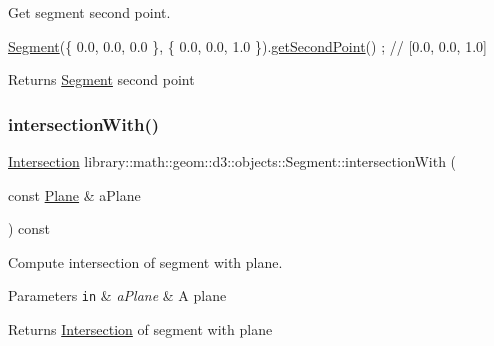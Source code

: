 Get segment second point. 


\begin{DoxyCode}
\hyperlink{classlibrary_1_1math_1_1geom_1_1d3_1_1objects_1_1_segment_a5562342d1edf2f52e37ce1bc138ee7d7}{Segment}(\{ 0.0, 0.0, 0.0 \}, \{ 0.0, 0.0, 1.0 \}).\hyperlink{classlibrary_1_1math_1_1geom_1_1d3_1_1objects_1_1_segment_a5d824fed334185975226d8f7e8489ced}{getSecondPoint}() ; \textcolor{comment}{// [0.0, 0.0, 1.0]}
\end{DoxyCode}


\begin{DoxyReturn}{Returns}
\hyperlink{classlibrary_1_1math_1_1geom_1_1d3_1_1objects_1_1_segment}{Segment} second point 
\end{DoxyReturn}
\mbox{\label{classlibrary_1_1math_1_1geom_1_1d3_1_1objects_1_1_segment_a75768b02696b8ce9415b7f2da7d8f411}} 
\subsubsection{\texorpdfstring{intersection\+With()}{intersectionWith()}}
{\footnotesize\ttfamily \hyperlink{classlibrary_1_1math_1_1geom_1_1d3_1_1_intersection}{Intersection} library\+::math\+::geom\+::d3\+::objects\+::\+Segment\+::intersection\+With (\begin{DoxyParamCaption}\item[{const \hyperlink{classlibrary_1_1math_1_1geom_1_1d3_1_1objects_1_1_plane}{Plane} \&}]{a\+Plane }\end{DoxyParamCaption}) const}



Compute intersection of segment with plane. 


\begin{DoxyParams}[1]{Parameters}
\mbox{\tt in}  & {\em a\+Plane} & A plane \\
\hline
\end{DoxyParams}
\begin{DoxyReturn}{Returns}
\hyperlink{classlibrary_1_1math_1_1geom_1_1d3_1_1_intersection}{Intersection} of segment with plane 
\end{DoxyReturn}
\mbox{\label{classlibrary_1_1math_1_1geom_1_1d3_1_1objects_1_1_segment_a8ba39afb970cc57b1e11ebd5eaf82db4}} 

